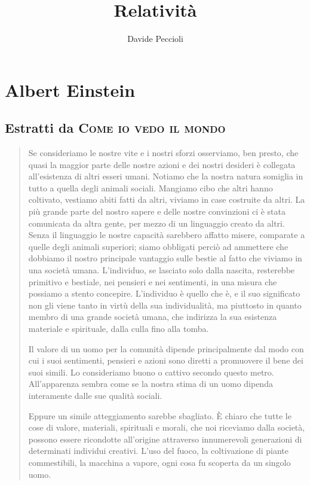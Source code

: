 \documentclass[a4paper, oneside]{article}
\title{Relatività}
\author{Davide Peccioli}
\date{}
\newcounter{i}%
\newcounter{n}%
\newcounter{I}%
\newcommand{\titolo}[1]{\textsc{#1}} %
\begin{document}
\maketitle

\tableofcontents

\section{Albert Einstein}

\subsection*{Estratti da \titolo{Come io vedo il mondo}}

\begin{quotation}
Se consideriamo le nostre vite e i nostri sforzi osserviamo, ben presto, che quasi la maggior parte delle nostre azioni e dei nostri desideri è collegata all'esistenza di altri esseri umani. Notiamo che la nostra natura somiglia in tutto a quella degli animali sociali. Mangiamo cibo che altri hanno coltivato, vestiamo abiti fatti da altri, viviamo in case costruite da altri. La più grande parte del nostro sapere e delle nostre convinzioni ci è stata comunicata da altra gente, per mezzo di un linguaggio creato da altri. Senza il linguaggio le nostre capacità sarebbero affatto misere, comparate a quelle degli animali superiori; siamo obbligati perciò ad ammettere che dobbiamo il nostro principale vantaggio sulle bestie al fatto che viviamo in una società umana. L’individuo, se lasciato solo dalla nascita, resterebbe primitivo e bestiale, nei pensieri e nei sentimenti, in una misura che possiamo a stento concepire. L’individuo è quello che è, e il suo significato non gli viene tanto in virtù della sua individualità, ma piuttosto in quanto membro di una grande società umana, che indirizza la sua esistenza materiale e spirituale, dalla culla fino alla tomba.

Il valore di un uomo per la comunità dipende principalmente dal modo con cui i suoi sentimenti, pensieri e azioni sono diretti a promuovere il bene dei suoi simili. Lo consideriamo buono o cattivo secondo questo metro. All'apparenza sembra come se la nostra stima di un uomo dipenda interamente dalle sue qualità sociali.

Eppure un simile atteggiamento sarebbe sbagliato. È chiaro che tutte le cose di valore, materiali, spirituali e morali, che noi riceviamo dalla società, possono essere ricondotte all'origine attraverso innumerevoli generazioni di determinati individui creativi. L’uso del fuoco, la coltivazione di piante commestibili, la macchina a vapore, ogni cosa fu scoperta da un singolo uomo.


\end{quotation}
\end{document}
